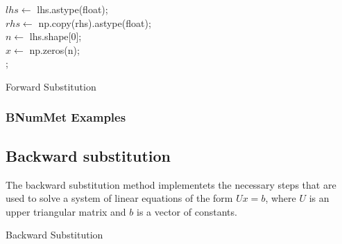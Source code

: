 \begin{algorithm}[H]
\label{alg:Forward Substitution}
$lhs \gets$ lhs.astype(float);\\
$rhs \gets$ np.copy(rhs).astype(float);\\
$n \gets$ lhs.shape[0];\\
$x \gets$ np.zeros(n);\\

;
\caption{Forward Substitution}

\end{algorithm}
\subsubsection*{BNumMet Examples}



\subsection*{Backward substitution}
The backward substitution method implementets the necessary steps that are used to solve a system of linear equations of the form $Ux = b$, where $U$ is an upper triangular matrix and $b$ is a vector of constants.

\begin{algorithm}[H]
\label{alg:Backward Substitution}
\SetAlgoLined
{}
\caption{Backward Substitution}


\end{algorithm}
